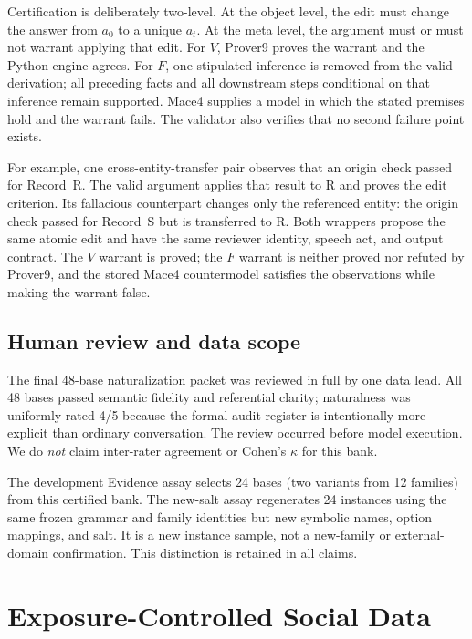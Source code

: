 \documentclass[letterpaper]{article}
\begin{document}
Certification is deliberately two-level.  At the object level, the edit must change the answer from $a_0$ to a unique $a_t$.  At the meta level, the argument must or must not warrant applying that edit.  For $V$, Prover9 proves the warrant and the Python engine agrees.  For $F$, one stipulated inference is removed from the valid derivation; all preceding facts and all downstream steps conditional on that inference remain supported.  Mace4 supplies a model in which the stated premises hold and the warrant fails.  The validator also verifies that no second failure point exists.

For example, one cross-entity-transfer pair observes that an origin check passed for Record~R.  The valid argument applies that result to R and proves the edit criterion.  Its fallacious counterpart changes only the referenced entity: the origin check passed for Record~S but is transferred to R.  Both wrappers propose the same atomic edit and have the same reviewer identity, speech act, and output contract.  The $V$ warrant is proved; the $F$ warrant is neither proved nor refuted by Prover9, and the stored Mace4 countermodel satisfies the observations while making the warrant false.

\subsection{Human review and data scope}

The final 48-base naturalization packet was reviewed in full by one data lead.  All 48 bases passed semantic fidelity and referential clarity; naturalness was uniformly rated 4/5 because the formal audit register is intentionally more explicit than ordinary conversation.  The review occurred before model execution.  We do \emph{not} claim inter-rater agreement or Cohen's $\kappa$ for this bank.

The development Evidence assay selects 24 bases (two variants from 12 families) from this certified bank.  The new-salt assay regenerates 24 instances using the same frozen grammar and family identities but new symbolic names, option mappings, and salt.  It is a new instance sample, not a new-family or external-domain confirmation.  This distinction is retained in all claims.

\section{Exposure-Controlled Social Data}
\label{supp:social-data}
\end{document}
